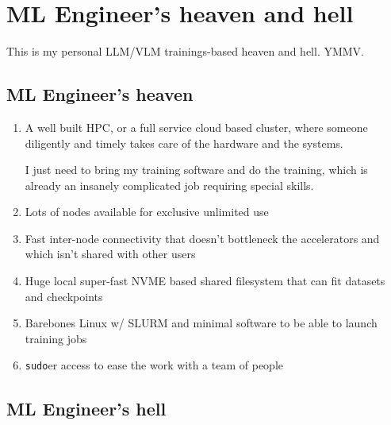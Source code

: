 \documentclass[
]{report}
\begin{document}
\section{ML Engineer's heaven and
hell}\label{ml-engineers-heaven-and-hell}

This is my personal LLM/VLM trainings-based heaven and hell. YMMV.

\subsection{ML Engineer's heaven}\label{ml-engineers-heaven}

\begin{enumerate}
\def\labelenumi{\arabic{enumi}.}
\item
  A well built HPC, or a full service cloud based cluster, where someone
  diligently and timely takes care of the hardware and the systems.

  I just need to bring my training software and do the training, which
  is already an insanely complicated job requiring special skills.
\item
  Lots of nodes available for exclusive unlimited use
\item
  Fast inter-node connectivity that doesn't bottleneck the accelerators
  and which isn't shared with other users
\item
  Huge local super-fast NVME based shared filesystem that can fit
  datasets and checkpoints
\item
  Barebones Linux w/ SLURM and minimal software to be able to launch
  training jobs
\item
  \texttt{sudo}er access to ease the work with a team of people
\end{enumerate}

\subsection{ML Engineer's hell}\label{ml-engineers-hell}
\end{document}
